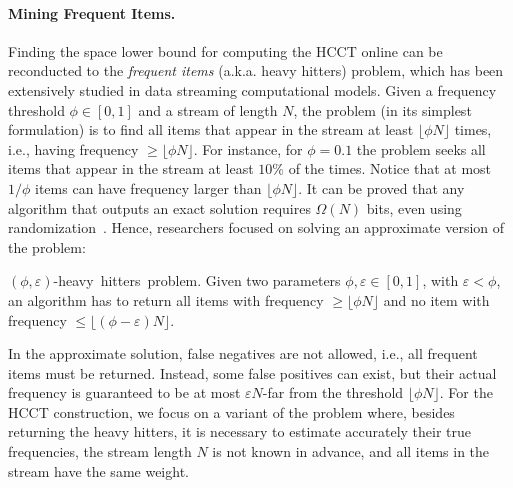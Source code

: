 \paragraph*{Mining Frequent Items.} Finding the space lower bound for computing the HCCT online can be reconducted to the {\em frequent items} (a.k.a. heavy hitters) problem, which has been extensively studied in data streaming computational models. Given a frequency threshold $\phi\in[0,1]$ and a stream of length $N$, the problem (in its simplest formulation) is to find all items that appear in the stream at least $\lfloor\phi N\rfloor$ times, i.e., having frequency $\ge\lfloor\phi N\rfloor$. For instance, for $\phi=0.1$ the problem seeks all items that appear in the stream at least $10\%$ of the times. Notice that at most $1/\phi$ items can have frequency larger than $\lfloor\phi N\rfloor$.  It can be proved that any algorithm that outputs an exact solution requires $\Omega(N)$ bits, even using randomization~\cite{Muthukrishnan05}. Hence, researchers focused on solving an approximate version of the problem:

\begin{definition} 
{\mbox{$(\phi,\varepsilon)$-heavy hitters problem.}} Given two parameters $\phi,\varepsilon\in[0,1]$, with $\varepsilon<\phi$, an algorithm has to return all items with frequency $\ge\lfloor\phi N\rfloor$ and no item with frequency $\le\lfloor(\phi-\varepsilon) N\rfloor$.
\end{definition} 

\noindent In the approximate solution, false negatives are not allowed, i.e., all frequent items must be returned. Instead, some false positives can exist, but their actual frequency is guaranteed to be at most $\varepsilon N$-far from the threshold $\lfloor\phi N\rfloor$. For the HCCT construction, we focus on a variant of the problem where, besides returning the heavy hitters, it is necessary to estimate accurately their true frequencies, the stream length $N$ is not known in advance, and all items in the stream have the same weight.

